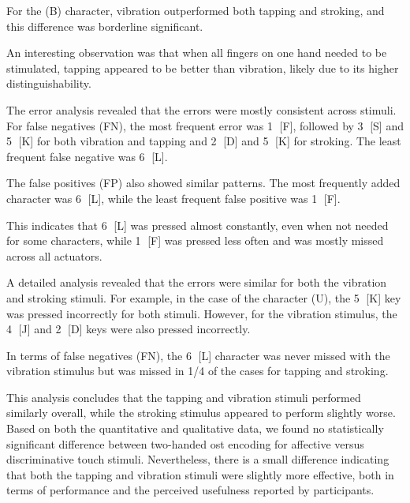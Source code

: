 For the  (B) character, vibration outperformed both tapping and stroking, and this difference was borderline significant.

An interesting observation was that when all fingers on one hand needed to be stimulated, tapping appeared to be better than vibration, likely due to its higher distinguishability.





The error analysis revealed that the errors were mostly consistent across stimuli. For false negatives (FN), the most frequent error was \textcircled{1} [F], followed by \textcircled{3} [S] and \textcircled{5} [K] for both vibration and tapping and \textcircled{2} [D] and \textcircled{5} [K] for stroking. The least frequent false negative was \textcircled{6} [L].

The false positives (FP) also showed similar patterns. The most frequently added character was \textcircled{6} [L], while the least frequent false positive was \textcircled{1} [F].

This indicates that \textcircled{6} [L] was pressed almost constantly, even when not needed for some characters, while \textcircled{1} [F] was pressed less often and was mostly missed across all actuators.

A detailed analysis revealed that the errors were similar for both the vibration and stroking stimuli. For example, in the case of the character (U), the \textcircled{5} [K] key was pressed incorrectly for both stimuli. However, for the vibration stimulus, the \textcircled{4} [J] and \textcircled{2} [D] keys were also pressed incorrectly.

In terms of false negatives (FN), the \textcircled{6} [L] character was never missed with the vibration stimulus but was missed in 1/4 of the cases for tapping and stroking.

This analysis concludes that the tapping and vibration stimuli performed similarly overall, while the stroking stimulus appeared to perform slightly worse. Based on both the quantitative and qualitative data, we found no statistically significant difference between two-handed \gls{ost} encoding for affective versus discriminative touch stimuli. Nevertheless, there is a small difference indicating that both the tapping and vibration stimuli were slightly more effective, both in terms of performance and the perceived usefulness reported by participants.



